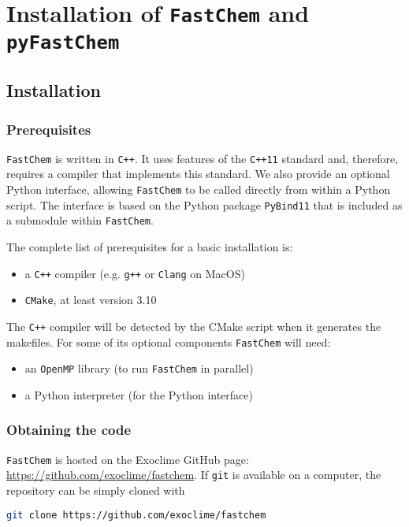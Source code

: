 \documentclass[numbers=noenddot]{fcmanual}
\newcommand{\fc}{\texttt{FastChem}\xspace}
\newcommand{\pfc}{\texttt{pyFastChem}\xspace}
\newcommand{\pb}{\texttt{PyBind11}\xspace}
\newcommand{\ttt}[1]{\texttt {#1}}
\begin{document}
\part{Installation of \fc and \pfc}
\label{part:install}

\chapter{Installation}

\section{Prerequisites}

\fc is written in \ttt{C++}. It uses features of the \ttt{C++11} standard and, therefore, requires a compiler that implements this standard. We also provide an optional Python interface, allowing \fc to be called directly from within a Python script. The interface is based on the Python package \pb that is included as a submodule within \fc.

The complete list of prerequisites for a basic installation is:
\begin{itemize}
	\item a \ttt{C++} compiler (e.g. \ttt{g++} or \ttt{Clang} on MacOS)
	\item \ttt{CMake}, at least version 3.10
\end{itemize}

The \ttt{C++} compiler will be detected by the CMake script when it generates the makefiles. For some of its optional components \fc will need:
\begin{itemize}
	\item an \ttt{OpenMP} library (to run \fc in parallel)
	\item a Python interpreter (for the Python interface)
\end{itemize}


\section{Obtaining the code}

\fc is hosted on the Exoclime GitHub page: \url{https://github.com/exoclime/fastchem}. If \texttt{git} is available on a computer, the repository can be simply cloned with

\begin{lstlisting}[language=bash]
  git clone https://github.com/exoclime/fastchem
\end{lstlisting}
\end{document}
